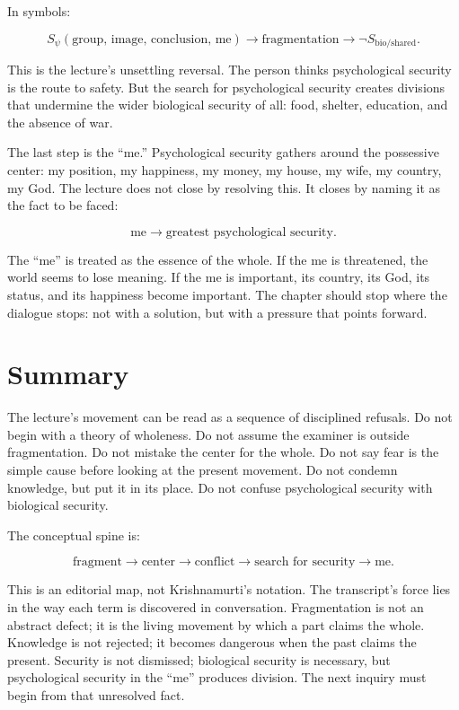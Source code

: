 In symbols:

\begin{equation}
S_{\psi}(\text{group, image, conclusion, me})
\longrightarrow
\text{fragmentation}
\longrightarrow
\neg S_{\mathrm{bio/shared}}.
\end{equation}

This is the lecture's unsettling reversal. The person thinks psychological security is the route to safety. But the search for psychological security creates divisions that undermine the wider biological security of all: food, shelter, education, and the absence of war.

The last step is the ``me.'' Psychological security gathers around the possessive center: my position, my happiness, my money, my house, my wife, my country, my God. The lecture does not close by resolving this. It closes by naming it as the fact to be faced:

\begin{equation}
\text{me}
\longrightarrow
\text{greatest psychological security}.
\end{equation}

The ``me'' is treated as the essence of the whole. If the me is threatened, the world seems to lose meaning. If the me is important, its country, its God, its status, and its happiness become important. The chapter should stop where the dialogue stops: not with a solution, but with a pressure that points forward.

\section{Summary}

The lecture's movement can be read as a sequence of disciplined refusals. Do not begin with a theory of wholeness. Do not assume the examiner is outside fragmentation. Do not mistake the center for the whole. Do not say fear is the simple cause before looking at the present movement. Do not condemn knowledge, but put it in its place. Do not confuse psychological security with biological security.

The conceptual spine is:

\begin{equation}
\text{fragment}
\longrightarrow
\text{center}
\longrightarrow
\text{conflict}
\longrightarrow
\text{search for security}
\longrightarrow
\text{me}.
\end{equation}

This is an editorial map, not Krishnamurti's notation. The transcript's force lies in the way each term is discovered in conversation. Fragmentation is not an abstract defect; it is the living movement by which a part claims the whole. Knowledge is not rejected; it becomes dangerous when the past claims the present. Security is not dismissed; biological security is necessary, but psychological security in the ``me'' produces division. The next inquiry must begin from that unresolved fact.